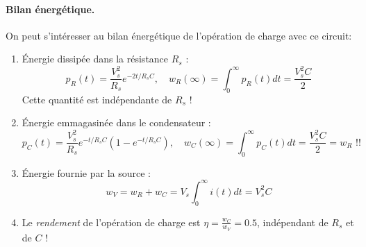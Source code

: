 \paragraph{Bilan énergétique.}
On peut s'intéresser au bilan énergétique de l'opération de charge avec ce circuit:
\begin{enumerate}
	\item 	Énergie dissipée dans la résistance $R_s$ :
	\[p_R(t)=\frac{V_s^2}{R_s}e^{-2t/R_sC}, \quad w_R(\infty)=\int_0^\infty
	p_R(t)dt= \frac{V_s^2C}{2}\]
	Cette quantité est indépendante de $R_s$ !
	\item Énergie emmagasinée dans le condensateur :
	\[p_C(t)=\frac{V_s^2}{R_s}e^{-t/R_sC}(1-e^{-t/R_sC}), \quad 
	w_C(\infty)=\int_0^\infty
	p_C(t)dt= \frac{V_s^2C}{2} = w_R \text{~!!}\]
	\item Énergie fournie par la source :\\
	\[w_V=w_R+w_C=V_s\int_0^\infty i(t)dt=V_s^2C\]
	\item Le \textit{rendement} de l'opération de charge est  $\eta=\frac{w_C}{w_V}=0.5$, indépendant de $R_s$ et de $C$ !
\end{enumerate}

